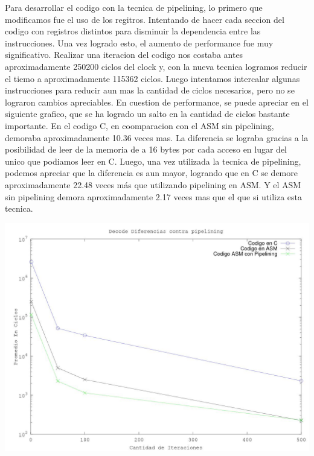 Para desarrollar el codigo con la tecnica de pipelining, lo primero que modificamos fue el uso de los regitros. Intentando de hacer cada seccion del codigo con registros distintos para disminuir la dependencia entre las instrucciones. Una vez logrado esto, el aumento de performance fue muy significativo. Realizar una iteracion del codigo nos costaba antes aproximadamente 250200 ciclos del clock y, con la nueva tecnica logramos reducir el tiemo a aproximadamente 115362 ciclos.
\newline
Luego intentamos intercalar algunas instrucciones para reducir aun mas la cantidad de ciclos necesarios, pero no se lograron cambios apreciables.
\newline
\newline
En cuestion de performance, se puede apreciar en el siguiente grafico, que se ha logrado un salto en la cantidad de ciclos bastante importante. En el codigo C, en coomparacion con el ASM sin pipelining, demoraba aproximadamente 10.36 veces mas. La diferencia se lograba gracias a la posibilidad de leer de la memoria de a 16 bytes por cada acceso en lugar del unico que podiamos leer en C. Luego, una vez utilizada la tecnica de pipelining, podemos apreciar que la diferencia es aun mayor, logrando que en C se demore aproximadamente 22.48 veces más que utilizando pipelining en ASM. Y el ASM sin pipelining demora aproximadamente 2.17 veces mas que el que si utiliza esta tecnica.
\newline

\includegraphics[scale=0.7]{imagenes/DecodePipelining.jpg}
